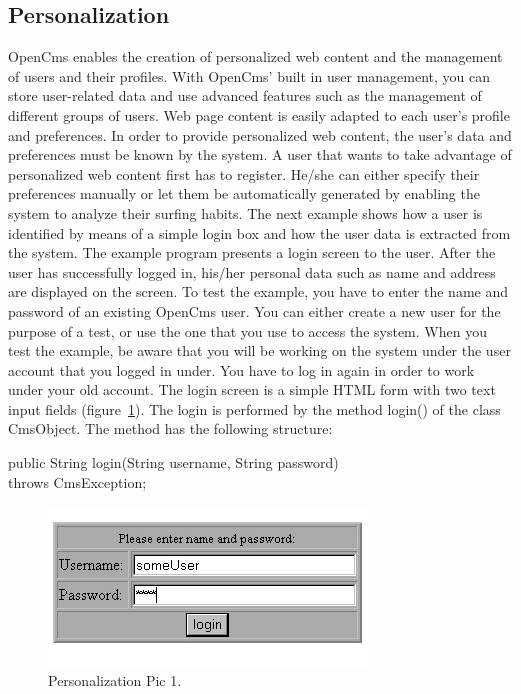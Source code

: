 \subsection {Personalization}

OpenCms enables the creation of personalized web content and
the management of users and their profiles. With OpenCms' built in user
management, you can store user-related data and use advanced features
such as the management of different groups of users.
Web page content is easily adapted to each user's profile and
preferences. In order to provide personalized web content, the user's
data and preferences must be known by the system. A user that wants to
take advantage of personalized web content first has to register. He/she
can either specify their preferences manually or let them be
automatically generated by enabling the system to analyze their surfing habits.
The next example shows how a user is identified by means of a simple
login box and how the user data is extracted from the system. The
example program presents a login screen to the user. After the user
has successfully logged in, his/her personal data such as name and
address are displayed on the screen.
To test the example, you have to enter the name and password of an
existing OpenCms user. You can either create a new user for the purpose
of a test, or use the one that you use to access the system. When you
test the example, be aware that you will be working on the system under
the user account that you logged in under. You have to log in again in
order to work under your old account.
The login screen is a simple HTML form with two text input fields 
(figure~\ref{Password}). 
The login is performed by the method {\meth login()} of the class 
{\class CmsObject}. The method has the following structure:

{\code public String login(String username, String password)\\
throws CmsException;}

\begin{figure}
\begin{center}
\includegraphics[clip,width=0.4\linewidth]{pics/modules/48}
\end{center}
\caption[Personalization Pic 1 ]{Personalization Pic 1.}
\label{Password}
\end{figure}

